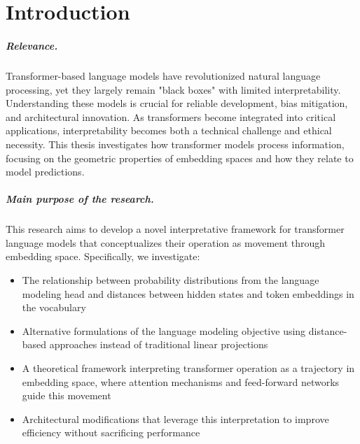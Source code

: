 \chapter{Introduction}

\paragraph{Relevance.}
Transformer-based language models have revolutionized natural language processing, yet they largely remain "black boxes" with limited interpretability. Understanding these models is crucial for reliable development, bias mitigation, and architectural innovation. As transformers become integrated into critical applications, interpretability becomes both a technical challenge and ethical necessity. This thesis investigates how transformer models process information, focusing on the geometric properties of embedding spaces and how they relate to model predictions.

\paragraph{Main purpose of the research.}
This research aims to develop a novel interpretative framework for transformer language models that conceptualizes their operation as movement through embedding space. Specifically, we investigate:
\begin{itemize}
    \item The relationship between probability distributions from the language modeling head and distances between hidden states and token embeddings in the vocabulary
    \item Alternative formulations of the language modeling objective using distance-based approaches instead of traditional linear projections
    \item A theoretical framework interpreting transformer operation as a trajectory in embedding space, where attention mechanisms and feed-forward networks guide this movement
    \item Architectural modifications that leverage this interpretation to improve efficiency without sacrificing performance
\end{itemize}

